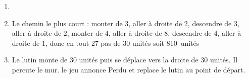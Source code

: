 
\begin{enumerate}
	\item  %
	\begin{scratch}[scale=0.8]  \end{scratch} 
	
	\item %
Le chemin le plus court : monter de 3, aller à droite de 2, descendre de 3, aller à droite de 2, monter de 4, aller à droite de 8, descendre de 4, aller à droite de 1, donc en tout 27 pas de 30 unités soit 810~unités	
	\item %
Le lutin monte de 30 unités puis se déplace vers la droite de 30 unités. Il percute le mur. le jeu annonce \og Perdu \fg{} et replace le lutin au point de départ.
\end{enumerate}

\vspace{0,5cm}

